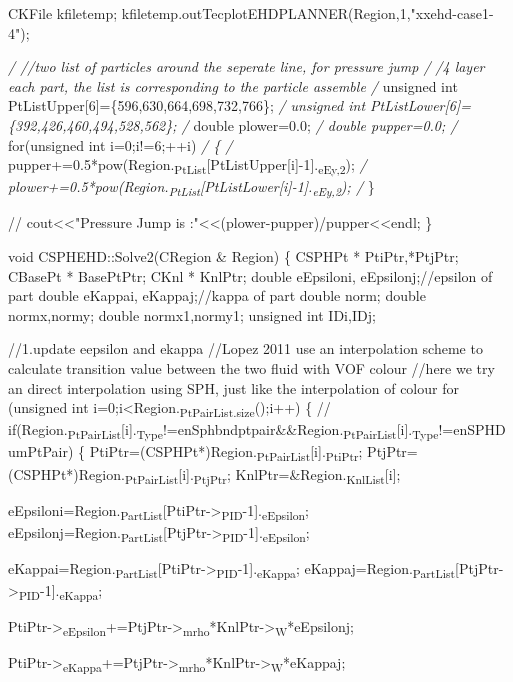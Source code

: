 \documentclass[presentation]{beamer}
\begin{document}
CKFile kfiletemp;
  kfiletemp.outTecplotEHDPLANNER(Region,1,"xxehd-case1-4");

  \emph{/ //two list of particles around the seperate line, for pressure jump
/} \emph{/4 layer each part, the list is corresponding to the particle assemble
/} unsigned int PtListUpper[6]=\{596,630,664,698,732,766\};
\emph{/ unsigned int PtListLower[6]=\{392,426,460,494,528,562\};
/} double plower=0.0;
\emph{/ double pupper=0.0;
/} for(unsigned int i=0;i!=6;++i)
\emph{/   \{
/}     pupper+=0.5*pow(Region.\textsubscript{PtList}[PtListUpper[i]-1].\textsubscript{eEy,2});
\emph{/     plower+=0.5*pow(Region.\textsubscript{PtList}[PtListLower[i]-1].\textsubscript{eEy,2});
/}   \}

  // cout<<"Pressure Jump is :"<<(plower-pupper)/pupper<<endl;
\}




void CSPHEHD::Solve2(CRegion \& Region)
\{
  CSPHPt * PtiPtr,*PtjPtr;
  CBasePt * BasePtPtr;
  CKnl * KnlPtr;
  double eEpsiloni, eEpsilonj;//epsilon of part
  double eKappai, eKappaj;//kappa of part
  double norm;
  double normx,normy;
  double normx1,normy1;
  unsigned int IDi,IDj;  

//1.update eepsilon and ekappa
//Lopez 2011 use an interpolation scheme to calculate transition value between the two fluid with VOF colour
//here we try an direct interpolation using SPH, just like the interpolation of colour
for (unsigned int i=0;i<Region.\textsubscript{PtPairList.size}();i++)
  \{
    // if(Region.\textsubscript{PtPairList}[i].\textsubscript{Type}!=enSphbndptpair\&\&Region.\textsubscript{PtPairList}[i].\textsubscript{Type}!=enSPHDumPtPair)
    \{
      PtiPtr=(CSPHPt*)Region.\textsubscript{PtPairList}[i].\textsubscript{PtiPtr};
      PtjPtr=(CSPHPt*)Region.\textsubscript{PtPairList}[i].\textsubscript{PtjPtr};
      KnlPtr=\&Region.\textsubscript{KnlList}[i];

eEpsiloni=Region.\textsubscript{PartList}[PtiPtr->\textsubscript{PID}-1].\textsubscript{eEpsilon};
eEpsilonj=Region.\textsubscript{PartList}[PtjPtr->\textsubscript{PID}-1].\textsubscript{eEpsilon};

eKappai=Region.\textsubscript{PartList}[PtiPtr->\textsubscript{PID}-1].\textsubscript{eKappa};
eKappaj=Region.\textsubscript{PartList}[PtjPtr->\textsubscript{PID}-1].\textsubscript{eKappa};

PtiPtr->\textsubscript{eEpsilon}+=PtjPtr->\textsubscript{mrho}*KnlPtr->\textsubscript{W}*eEpsilonj;

PtiPtr->\textsubscript{eKappa}+=PtjPtr->\textsubscript{mrho}*KnlPtr->\textsubscript{W}*eKappaj;
\end{document}
